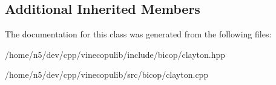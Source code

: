 \subsection*{Additional Inherited Members}


The documentation for this class was generated from the following files\+:\begin{DoxyCompactItemize}
\item 
/home/n5/dev/cpp/vinecopulib/include/bicop/clayton.\+hpp\item 
/home/n5/dev/cpp/vinecopulib/src/bicop/clayton.\+cpp\end{DoxyCompactItemize}
